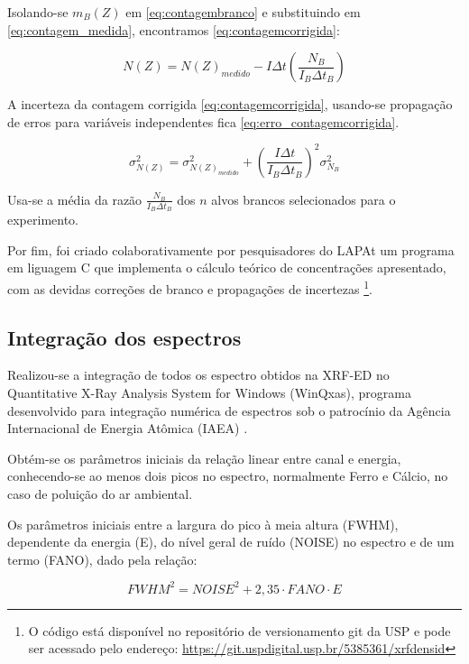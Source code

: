 Isolando-se $m_B(Z)$ em \ref{eq:contagembranco} e substituindo em 
\ref{eq:contagem_medida}, encontramos \ref{eq:contagemcorrigida}:
 
\begin{equation}
  \label{eq:contagemcorrigida}
  N(Z) = N(Z)_{medido} - I\Delta t \left( \frac{N_B}{I_B \Delta t_B} \right)
\end{equation}

A incerteza da contagem corrigida \ref{eq:contagemcorrigida}, 
usando-se propagação de erros para variáveis independentes fica
\ref{eq:erro_contagemcorrigida}.

\begin{equation}
  \label{eq:erro_contagemcorrigida}
  \sigma_{N(Z)}^2 = \sigma_{N(Z)_{medido}}^2 + \left( \frac{I \Delta t}{I_B \Delta t_B} \right)^2 \sigma_{N_B}^2
\end{equation}

Usa-se a média da razão $\frac{N_B}{I_B \Delta t_B}$ dos $n$ alvos brancos
selecionados para o experimento. 

Por fim, foi criado colaborativamente por pesquisadores do LAPAt um programa 
em liguagem C que implementa o cálculo teórico de concentrações apresentado, 
com as devidas correções de branco e propagações de incertezas \footnote{
O código está disponível no repositório de versionamento git da USP 
e pode ser acessado pelo endereço: 
\url{https://git.uspdigital.usp.br/5385361/xrfdensid}}.

\subsection{Integração dos espectros}

Realizou-se a integração de todos os espectro obtidos na XRF-ED no
Quantitative X-Ray Analysis System for Windows (WinQxas),
programa desenvolvido para integração numérica de espectros sob o patrocínio 
da Agência Internacional de Energia Atômica (IAEA) \citep{capote2000}.

Obtém-se os parâmetros iniciais da relação linear entre canal e energia,
conhecendo-se ao menos dois picos no espectro, normalmente Ferro e Cálcio, 
no caso de poluição do ar ambiental. 

Os parâmetros iniciais entre a largura do pico à meia altura (FWHM),
dependente da energia (E), do nível geral de ruído (NOISE) no espectro 
e de um termo (FANO), dado pela relação: 

\begin{equation}
  \label{eq:fwhm}
   {FWHM}^2 = {NOISE}^2 + 2,35 \cdot FANO  \cdot E
\end{equation}

